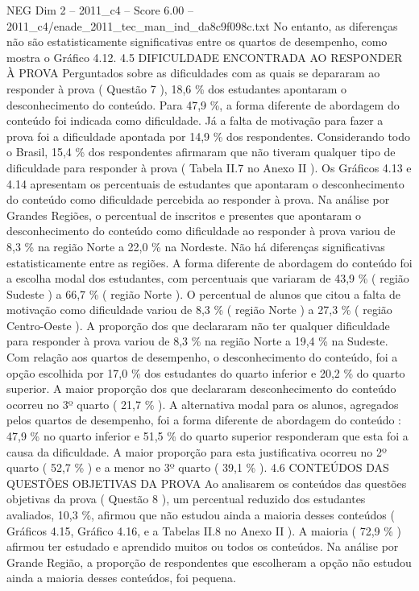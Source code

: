 \begin{textsample}{NEG Dim 2 – 2011\_c4 – Score 6.00 – 2011\_c4/enade\_2011\_tec\_man\_ind\_da8c9f098c.txt}
No entanto, as diferenças não são estatisticamente significativas entre os quartos de desempenho, como mostra o Gráfico 4.12. 4.5 DIFICULDADE ENCONTRADA AO RESPONDER À PROVA Perguntados sobre as dificuldades com as quais se depararam ao responder à prova ( Questão 7 ), 18,6 \% dos estudantes apontaram o desconhecimento do conteúdo.
Para 47,9 \%, a forma diferente de abordagem do conteúdo foi indicada como dificuldade.
Já a falta de motivação para fazer a prova foi a dificuldade apontada por 14,9 \% dos respondentes.
Considerando todo o Brasil, 15,4 \% dos respondentes afirmaram que não tiveram qualquer tipo de dificuldade para responder à prova ( Tabela II.7 no Anexo II ).
Os Gráficos 4.13 e 4.14 apresentam os percentuais de estudantes que apontaram o desconhecimento do conteúdo como dificuldade percebida ao responder à prova.
Na análise por Grandes Regiões, o percentual de inscritos e presentes que apontaram o desconhecimento do conteúdo como dificuldade ao responder à prova variou de 8,3 \% na região Norte a 22,0 \% na Nordeste.
Não há diferenças significativas estatisticamente entre as regiões.
A forma diferente de abordagem do conteúdo foi a escolha modal dos estudantes, com percentuais que variaram de 43,9 \% ( região Sudeste ) a 66,7 \% ( região Norte ).
O percentual de alunos que citou a falta de motivação como dificuldade variou de 8,3 \% ( região Norte ) a 27,3 \% ( região Centro-Oeste ).
A proporção dos que declararam não ter qualquer dificuldade para responder à prova variou de 8,3 \% na região Norte a 19,4 \% na Sudeste.
Com relação aos quartos de desempenho, o desconhecimento do conteúdo, foi a opção escolhida por 17,0 \% dos estudantes do quarto inferior e 20,2 \% do quarto superior.
A maior proporção dos que declararam desconhecimento do conteúdo ocorreu no 3º quarto ( 21,7 \% ).
A alternativa modal para os alunos, agregados pelos quartos de desempenho, foi a forma diferente de abordagem do conteúdo : 47,9 \% no quarto inferior e 51,5 \% do quarto superior responderam que esta foi a causa da dificuldade.
A maior proporção para esta justificativa ocorreu no 2º quarto ( 52,7 \% ) e a menor no 3º quarto ( 39,1 \% ). 4.6 CONTEÚDOS DAS QUESTÕES OBJETIVAS DA PROVA Ao analisarem os conteúdos das questões objetivas da prova ( Questão 8 ), um percentual reduzido dos estudantes avaliados, 10,3 \%, afirmou que não estudou ainda a maioria desses conteúdos ( Gráficos 4.15, Gráfico 4.16, e a Tabelas II.8 no Anexo II ).
A maioria ( 72,9 \% ) afirmou ter estudado e aprendido muitos ou todos os conteúdos.
Na análise por Grande Região, a proporção de respondentes que escolheram a opção não estudou ainda a maioria desses conteúdos, foi pequena.

\end{textsample}
